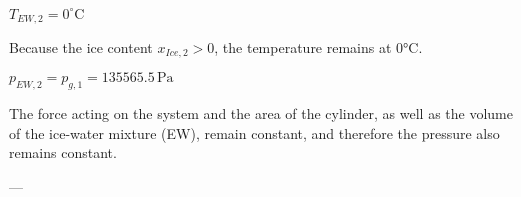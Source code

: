 \( T_{EW,2} = 0^\circ \text{C} \)  

Because the ice content \( x_{Ice,2} > 0 \), the temperature remains at 0°C.  

\( p_{EW,2} = p_{g,1} = 135565.5 \, \text{Pa} \)  

The force acting on the system and the area of the cylinder, as well as the volume of the ice-water mixture (EW), remain constant, and therefore the pressure also remains constant.  

---